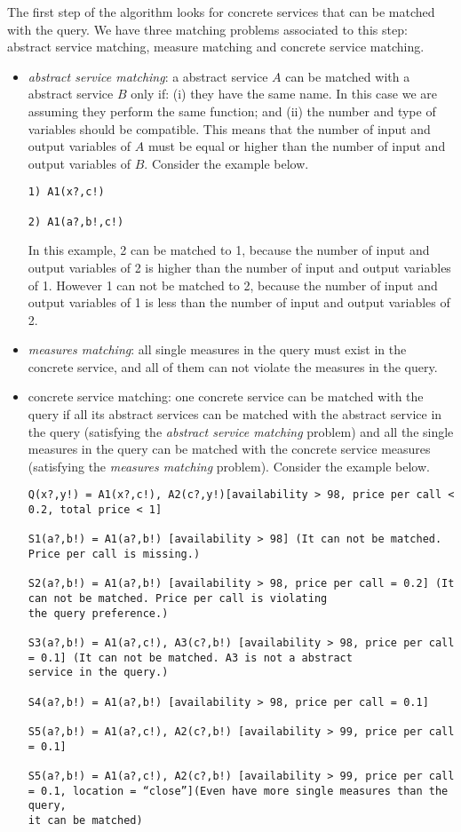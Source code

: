 \documentclass[12pt,a4paper,oneside]{article}
\begin{document}
The first step of the algorithm looks for concrete services that can be matched with the query. We have three matching problems associated to this step: abstract service matching, measure matching and concrete service matching.
\begin{itemize}
\item \textit{abstract service matching}: a abstract service $A$ can be matched with a abstract service $B$ only if: (i) they have the same name. In this case we are assuming they perform the same function; and (ii) the number and type of variables should be compatible. This means that the number of input and output variables of $A$ must be equal or higher than the number of input and output variables of $B$. Consider the example below.
\begin{verbatim}
1) A1(x?,c!)
	
2) A1(a?,b!,c!)
\end{verbatim}
In this example, 2 can be matched to 1, because the number of input and output variables of 2 is higher than the number of input and output variables of 1.
However 1 can not be matched to 2, because the number of input and output variables of 1 is less than the number of input and output variables of 2.
\item \textit{measures matching}: all single measures in the query must exist in the concrete service, and all of them can not violate the measures in the query.
\item concrete service matching: one concrete service can be matched with the query if all its abstract services can be matched with the abstract service in the query (satisfying the \textit{abstract service matching} problem) and all the single measures in the query can be matched with the concrete service measures (satisfying the \textit{measures matching} problem). Consider the example below.
\begin{tiny}
\begin{verbatim}
Q(x?,y!) = A1(x?,c!), A2(c?,y!)[availability > 98, price per call < 0.2, total price < 1]
	
S1(a?,b!) = A1(a?,b!) [availability > 98] (It can not be matched. Price per call is missing.)

S2(a?,b!) = A1(a?,b!) [availability > 98, price per call = 0.2] (It can not be matched. Price per call is violating
the query preference.)

S3(a?,b!) = A1(a?,c!), A3(c?,b!) [availability > 98, price per call = 0.1] (It can not be matched. A3 is not a abstract
service in the query.)

S4(a?,b!) = A1(a?,b!) [availability > 98, price per call = 0.1]

S5(a?,b!) = A1(a?,c!), A2(c?,b!) [availability > 99, price per call = 0.1]

S5(a?,b!) = A1(a?,c!), A2(c?,b!) [availability > 99, price per call = 0.1, location = “close”](Even have more single measures than the query, 
it can be matched)
\end{verbatim}
\end{tiny}
\end{itemize}
\end{document}
